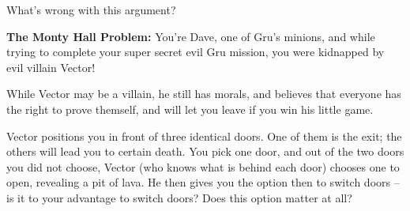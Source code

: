 \documentclass{article}
\begin{document}
What’s wrong with this argument?

\textbf{The Monty Hall Problem:}
You're Dave, one of Gru's minions, and while trying to complete your super secret evil Gru mission, you were kidnapped by evil villain Vector! 

While Vector may be a villain, he still has morals, and believes that everyone has the right to prove themself, and will let you leave if you win his little game. 

Vector positions you in front of three identical doors. One of them is the exit; the others will lead you to certain death. You pick one door, and out of the two doors you did not choose, Vector (who knows what is behind each door) chooses one to open, revealing a pit of lava. He then gives you the option then to switch doors -- is it to your advantage to switch doors? Does this option matter at all?
\end{document}
